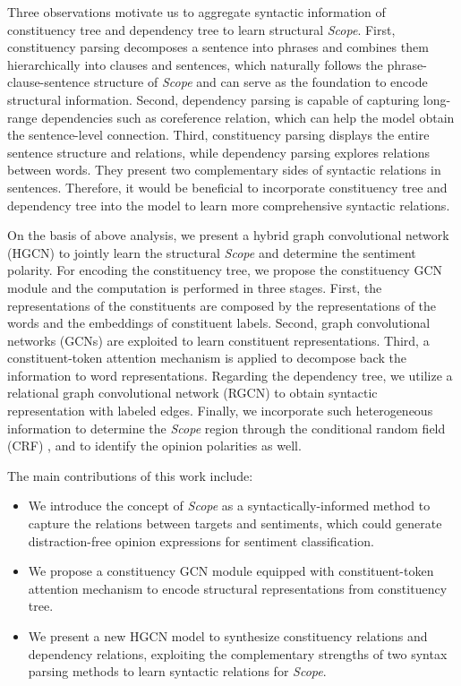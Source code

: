 \documentclass{article}
\begin{document}
Three observations motivate us to aggregate syntactic information of constituency tree and dependency tree to learn structural \emph{Scope}. First, constituency parsing decomposes a sentence into phrases and combines them hierarchically into clauses and sentences, which naturally follows the phrase-clause-sentence structure of \emph{Scope} and can serve as the foundation to encode structural information. Second, dependency parsing is capable of capturing long-range dependencies such as coreference relation, which can help the model obtain the sentence-level connection. Third, constituency parsing displays the entire sentence structure and relations, while dependency parsing explores relations between words. They present two complementary sides of syntactic relations in sentences. Therefore, it would be beneficial to incorporate constituency tree  and dependency tree into the model to learn more comprehensive syntactic relations.

On the basis of above analysis, we present a hybrid graph convolutional network (HGCN) to jointly learn the structural \emph{Scope} and determine the sentiment polarity. For encoding the constituency tree, we propose the constituency GCN module and the computation is performed in three stages. First, the representations of the constituents are composed by the representations of the words and the embeddings of constituent labels. Second, graph convolutional networks (GCNs) \cite{kipf2016semi} are exploited to learn constituent representations. Third, a constituent-token attention mechanism is applied to decompose back the information to word representations. Regarding the dependency tree, we utilize a relational graph convolutional network (RGCN) to obtain syntactic representation with labeled edges. Finally, we incorporate such heterogeneous information to determine the \emph{Scope} region through the conditional random field (CRF) \cite{lafferty2001conditional}, and to identify the opinion polarities as well.

The main contributions of this work include:
\begin{itemize}
\item We introduce the concept of \emph{Scope} as a syntactically-informed method to capture the relations between targets and sentiments, which could generate distraction-free opinion expressions for sentiment classification.
\item We propose a constituency GCN module equipped with constituent-token attention mechanism to encode structural representations from constituency tree. 
\item We present a new HGCN model to synthesize constituency relations and dependency relations, exploiting the complementary strengths of two syntax parsing methods to learn syntactic relations for \emph{Scope}.
\end{itemize}
\end{document}
